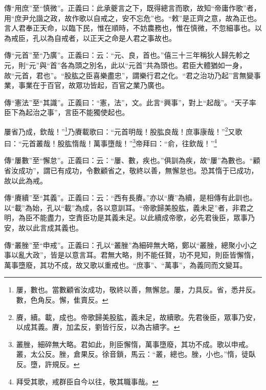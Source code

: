 {\noindent\zhuan{}\fzbyks 傳“用庶”至“慎微”。正義曰：此承夔言之下，既得總言而歌，故知“帝庸作歌”者，用“庶尹允諧之政，故作歌以自戒之，安不忘危”也。“敕”是正齊之意，故為正也。言人君奉正天命，以臨下民，惟在順時，不妨農務也，惟在慎微，不忽細事也。以為戒臣，孔以為自戒者，以正天之命是人君之事故也。 \par}

{\noindent\zhuan{}\fzbyks 傳“元首”至“乃廣”。正義曰：云：“元、良，首也。”僖三十三年稱狄人歸先軫之元，則“元”與“首”各為頭之別名，此以“元首”共為頭也。君臣大體猶如一身，故“元首，君也”。“股肱之臣喜樂盡忠”，謂樂行君之化。“君之治功乃起”言無變事業，事業在于百官，故眾功皆起，百官之業乃廣也。 \par}

{\noindent\zhuan{}\fzbyks 傳“憲法”至“其識”。正義曰：“憲，法”，文。此言“興事”，對上“起哉”。“天子率臣下為起治之事”，言臣不能獨使起也。 \par}

屢省乃成，欽哉！”\footnote{屢，數也。當數顧省汝成功，敬終以善，無懈怠。屢，力具反。省，悉井反。數，色角反。懈，隹賣反。}乃賡載歌曰：“元首明哉！股肱良哉！庶事康哉！”\footnote{賡，續。載，成也。帝歌歸美股肱，義未足，故續歌。先君後臣，眾事乃安，以成其義。賡，加孟反，劉皆行反，以為古續字。}又歌曰：“元首叢哉！股肱惰哉！萬事墮哉！”\footnote{叢脞，細碎無大略。君如此，則臣懈惰，萬事墮廢，其功不成。歌以申戒。叢，太公反。脞，倉果反。徐音鎖，馬云：“叢，總也。脞，小也。”惰，徒臥反。墮，許規反。}帝拜曰：“俞，往欽哉！”\footnote{拜受其歌，戒群臣自今以往，敬其職事哉。}

{\noindent\zhuan{}\fzbyks 傳“屢數”至“懈怠”。正義曰：云：“屢、數，疾也。”俱訓為疾，故“屢”為數也。“顧省汝成功”，謂已有成功，令數顧省之，敬終以善，無懈怠也。恐其惰于已成功，故以此為戒。 \par}

{\noindent\zhuan{}\fzbyks 傳“賡續”至“其義”。正義曰：云：“西有長賡。”亦以“賡”為續，是相傳有此訓也。以“載”為始，孔以“載”為成，各以意訓耳。“帝歌歸美股肱，義未足”者，非君之明，為臣不能盡力，空責臣功是其義未足。以此續成帝歌，必先君後臣，眾事乃安，故以此言成其義也。 \par}

{\noindent\zhuan{}\fzbyks 傳“叢脞”至“申戒”。正義曰：孔以“叢脞”為細碎無大略，鄭以“叢脞，總聚小小之事以亂大政”，皆是以意言耳。君無大略，則不能任賢，功不見知，則臣皆懈惰，萬事墮廢，其功不成，故又歌以重戒也。“庶事”、“萬事”，為義同而文變耳。 \par}

